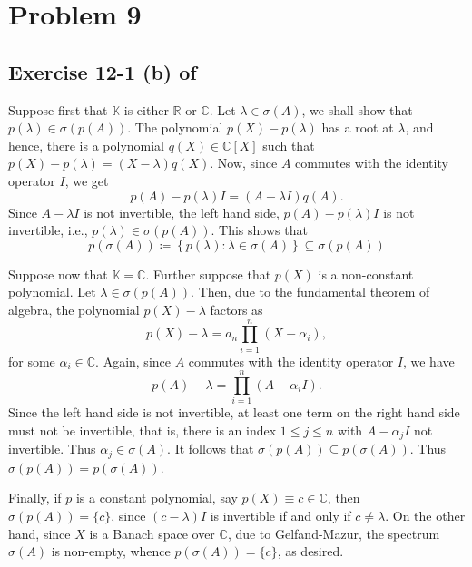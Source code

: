 \documentclass[10pt]{amsart}
\theoremstyle{thmstyle}
\theoremstyle{defstyle}
\newcommand{\R}{\mathbb{R}}
\newcommand{\bbC}{\mathbb{C}}
\newcommand{\K}{\mathbb{K}}
\renewcommand{\le}{\leqslant}
\begin{document}
\section{Problem 9}

\subsection*{Exercise 12-1 (b) of \texorpdfstring{\cite{limaye-functional}}{[Lim14]}}

Suppose first that $\K$ is either $\R$ or $\bbC$. Let $\lambda\in\sigma(A)$, we shall show that $p(\lambda)\in\sigma\left(p(A)\right)$. The polynomial $p(X) - p(\lambda)$ has a root at $\lambda$, and hence, there is a polynomial $q(X)\in\bbC[X]$ such that $p(X) - p(\lambda) = (X - \lambda)q(X)$. Now, since $A$ commutes with the identity operator $I$, we get \begin{equation*}
    p(A) - p(\lambda)I = (A - \lambda I)q(A).
\end{equation*}
Since $A - \lambda I$ is not invertible, the left hand side, $p(A) - p(\lambda)I$ is not invertible, i.e., $p(\lambda)\in\sigma\left(p(A)\right)$. This shows that 
\begin{equation*}
    p\left(\sigma(A)\right)\coloneq\left\{p(\lambda)\colon\lambda\in\sigma(A)\right\}\subseteq \sigma\left(p(A)\right)
\end{equation*}

Suppose now that $\K = \bbC$. Further suppose that $p(X)$ is a non-constant polynomial. Let $\lambda\in\sigma(p(A))$. Then, due to the fundamental theorem of algebra, the polynomial $p(X) - \lambda$ factors as 
\begin{equation*}
    p(X) - \lambda = a_n\prod_{i = 1}^n (X - \alpha_i),
\end{equation*}
for some $\alpha_i\in\bbC$. Again, since $A$ commutes with the identity operator $I$, we have 
\begin{equation*}
    p(A) - \lambda = \prod_{i = 1}^n (A - \alpha_i I).
\end{equation*}
Since the left hand side is not invertible, at least one term on the right hand side must not be invertible, that is, there is an index $1\le j\le n$ with $A - \alpha_j I$ not invertible. Thus $\alpha_j\in \sigma(A)$. It follows that $\sigma(p(A))\subseteq p(\sigma(A))$. Thus $\sigma(p(A)) = p(\sigma(A))$.

Finally, if $p$ is a constant polynomial, say $p(X) \equiv c\in\bbC$, then $\sigma(p(A)) = \{c\}$, since $(c - \lambda)I$ is invertible if and only if $c\ne\lambda$. On the other hand, since $X$ is a Banach space over $\bbC$, due to Gelfand-Mazur, the spectrum $\sigma(A)$ is non-empty, whence $p(\sigma(A)) = \{c\}$, as desired.
\end{document}
